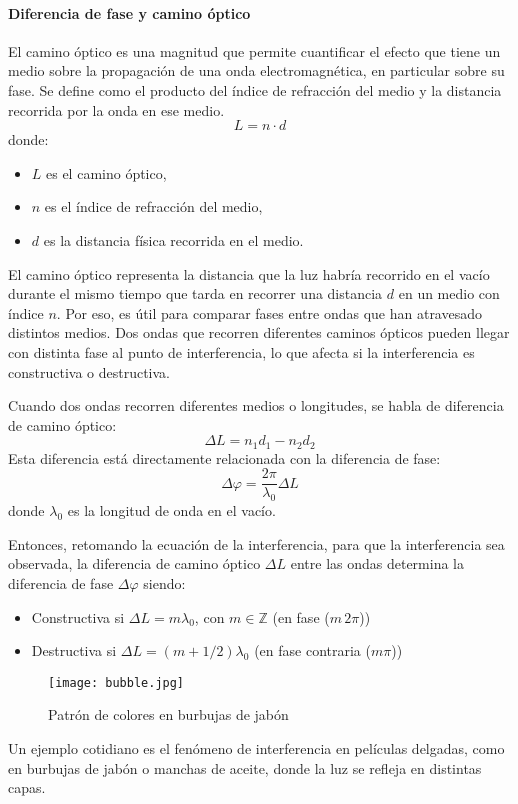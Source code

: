 \paragraph{Diferencia de fase y camino óptico}

El camino óptico es una magnitud que permite cuantificar el efecto que tiene un medio sobre la propagación de una onda electromagnética, en particular sobre su fase. Se define como el producto del índice de refracción del medio y la distancia recorrida por la onda en ese medio.
\[
L = n \cdot d
\]
donde:
\begin{itemize}
  \item $L$ es el camino óptico,
  \item $n$ es el índice de refracción del medio,
  \item $d$ es la distancia física recorrida en el medio.
\end{itemize}
El camino óptico representa la distancia que la luz habría recorrido en el vacío durante el mismo tiempo que tarda en recorrer una distancia \(d\) en un medio con índice \(n\). Por eso, es útil para comparar fases entre ondas que han atravesado distintos medios. Dos ondas que recorren diferentes caminos ópticos pueden llegar con distinta fase al punto de interferencia, lo que afecta si la interferencia es constructiva o destructiva.

Cuando dos ondas recorren diferentes medios o longitudes, se habla de diferencia de camino óptico:
\[
\Delta L = n_1 d_1 - n_2 d_2
\]
Esta diferencia está directamente relacionada con la diferencia de fase:
\[
\Delta \varphi = \frac{2\pi}{\lambda_0} \Delta L
\]
donde \(\lambda_0\) es la longitud de onda en el vacío.

Entonces, retomando la ecuación de la interferencia, para que la interferencia sea observada, la diferencia de camino óptico \(\Delta L\) entre las ondas determina la diferencia de fase \(\Delta \varphi\) siendo:
\begin{itemize}
  \item Constructiva si \(\Delta L = m \lambda_0\), con \(m \in \mathbb{Z}\) (en fase (\(m\,2\pi\)))
  \item Destructiva si \(\Delta L = (m + 1/2)\lambda_0\) (en fase contraria (\(m\pi\)))
\end{itemize}

\begin{wrapfigure}{r}{0.22\textwidth}
  \centering
  \texttt{[image: bubble.jpg]}
  \caption{Patrón de colores en burbujas de jabón}
  \label{fig:burbujas_jabon}
\end{wrapfigure}
Un ejemplo cotidiano es el fenómeno de interferencia en películas delgadas, como en burbujas de jabón o manchas de aceite, donde la luz se refleja en distintas capas.

